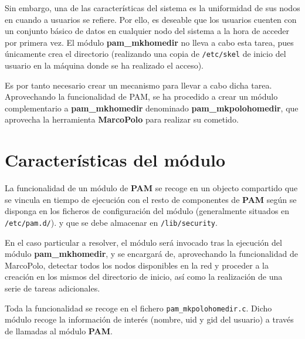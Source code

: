 \documentclass{article}
\begin{document}
Sin embargo, una de las características del sistema es la uniformidad de sus nodos en cuando a usuarios se refiere. Por ello, es deseable que los usuarios cuenten con un conjunto básico de datos en cualquier nodo del sistema a la hora de acceder por primera vez. El módulo \textbf{pam\_mkhomedir} no lleva a cabo esta tarea, pues únicamente crea el directorio (realizando una copia de \texttt{/etc/skel} de inicio del usuario en la máquina donde se ha realizado el acceso).

Es por tanto necesario crear un mecanismo para llevar a cabo dicha tarea. Aprovechando la funcionalidad de PAM, se ha procedido a crear un módulo complementario a \textbf{pam\_mkhomedir} denominado \textbf{pam\_mkpolohomedir}, que aprovecha la herramienta \textbf{MarcoPolo} para realizar su cometido.

\section{Características del módulo}

La funcionalidad de un módulo de \textbf{PAM} se recoge en un objecto compartido que se vincula en tiempo de ejecución con el resto de componentes de \textbf{PAM} según se disponga en los ficheros de configuración del módulo (generalmente situados en \texttt{/etc/pam.d/}). \cite{linux-pam-guide} y que se debe almacenar en \texttt{/lib/security}.  

En el caso particular a resolver, el módulo será invocado tras la ejecución del módulo \textbf{pam\_mkhomedir}, y se encargará de, aprovechando la funcionalidad de MarcoPolo, detectar todos los nodos disponibles en la red y proceder a la creación en los mismos del directorio de inicio, así como la realización de una serie de tareas adicionales.

Toda la funcionalidad se recoge en el fichero \texttt{pam\_mkpolohomedir.c}. Dicho módulo recoge la información de interés (nombre, uid y gid del usuario) a través de llamadas al módulo \textbf{PAM}\cite{linux-pam-guide-ch2}.


\end{document}
